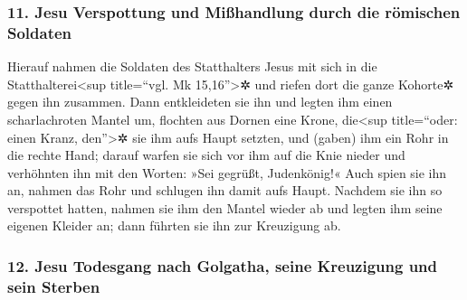 \hypertarget{jesu-verspottung-und-miuxdfhandlung-durch-die-ruxf6mischen-soldaten}{%
\subsubsection{11. Jesu Verspottung und Mißhandlung durch die römischen
Soldaten}\label{jesu-verspottung-und-miuxdfhandlung-durch-die-ruxf6mischen-soldaten}}

 Hierauf nahmen die Soldaten des Statthalters Jesus mit
sich in die Statthalterei\textless sup title=``vgl. Mk
15,16''\textgreater✲ und riefen dort die ganze Kohorte✲ gegen ihn
zusammen.  Dann entkleideten sie ihn und legten ihm einen
scharlachroten Mantel um,  flochten aus Dornen eine
Krone, die\textless sup title=``oder: einen Kranz, den''\textgreater✲
sie ihm aufs Haupt setzten, und (gaben) ihm ein Rohr in die rechte Hand;
darauf warfen sie sich vor ihm auf die Knie nieder und verhöhnten ihn
mit den Worten: »Sei gegrüßt, Judenkönig!«  Auch spien
sie ihn an, nahmen das Rohr und schlugen ihn damit aufs Haupt.
 Nachdem sie ihn so verspottet hatten, nahmen sie ihm den
Mantel wieder ab und legten ihm seine eigenen Kleider an; dann führten
sie ihn zur Kreuzigung ab.

\hypertarget{jesu-todesgang-nach-golgatha-seine-kreuzigung-und-sein-sterben}{%
\subsubsection{12. Jesu Todesgang nach Golgatha, seine Kreuzigung und
sein
Sterben}\label{jesu-todesgang-nach-golgatha-seine-kreuzigung-und-sein-sterben}}

